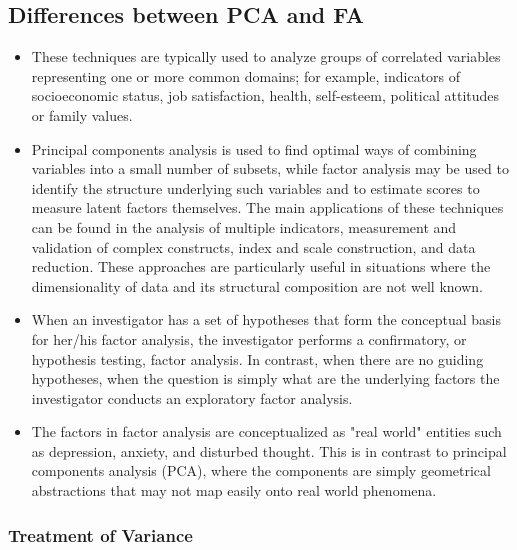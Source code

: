 \subsection{Differences between PCA and FA}
\begin{itemize}
	\item These techniques are typically used to analyze groups of correlated variables representing one or more common domains; for example, indicators of socioeconomic status, job satisfaction, health, self-esteem, political attitudes or family values. 
	\item	Principal components analysis is used to find optimal ways of combining variables into a small number of subsets, while factor analysis may be used to identify the structure underlying such variables and to estimate scores to measure latent factors themselves. The main applications of these techniques can be found in the analysis of multiple indicators, measurement and validation of complex constructs, index and scale construction, and data reduction. These approaches are particularly useful in situations where the dimensionality of data and its structural composition are not well known.
	
		\item When an investigator has a set of hypotheses that form the conceptual basis for her/his factor analysis, the investigator performs a confirmatory, or hypothesis testing, factor analysis. In contrast, when there are no guiding hypotheses, when the question is simply what are the underlying factors the investigator conducts an exploratory factor analysis. 
	
		\item The factors in factor analysis are conceptualized as "real world" entities such as depression, anxiety, and disturbed thought. This is in contrast to principal components analysis (PCA), where the components are simply geometrical abstractions that may not map easily onto real world phenomena.
\end{itemize}


\subsubsection{ Treatment of Variance}

